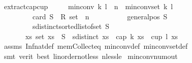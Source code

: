 \begin{isabellebody}
\isamarkupfalse%
%
\endisatagproof
{\isafoldproof}%
%
\isadelimproof
\isanewline
%
\endisadelimproof
\isanewline
{}\isamarkupfalse%
\ extract{\isacharunderscore}{\kern0pt}cap{\isacharunderscore}{\kern0pt}cup{\isacharcolon}{\kern0pt}\isanewline
\ \ \ \ \ {\isachardoublequoteopen}min{\isacharunderscore}{\kern0pt}conv\ k\ l\ {\isacharequal}{\kern0pt}\ n{\isachardoublequoteclose}\ \ {\isachardoublequoteopen}min{\isacharunderscore}{\kern0pt}conv{\isacharunderscore}{\kern0pt}set\ k\ l\ {\isasymnoteq}\ {\isacharbraceleft}{\kern0pt}{\isacharbraceright}{\kern0pt}{\isachardoublequoteclose}\isanewline
\ \ \ \ \ \ \ \ \ {\isachardoublequoteopen}card\ {\isacharparenleft}{\kern0pt}S\ {\isacharcolon}{\kern0pt}{\isacharcolon}{\kern0pt}\ R{}\ set{\isacharparenright}{\kern0pt}\ {\isacharequal}{\kern0pt}\ n{\isachardoublequoteclose}\ \isanewline
\ \ \ \ \ \ \ \ \ {\isachardoublequoteopen}general{\isacharunderscore}{\kern0pt}pos\ S{\isachardoublequoteclose}\isanewline
\ \ \ \ \ \ \ \ \ {\isachardoublequoteopen}sdistinct{\isacharparenleft}{\kern0pt}sorted{\isacharunderscore}{\kern0pt}list{\isacharunderscore}{\kern0pt}of{\isacharunderscore}{\kern0pt}set\ S{\isacharparenright}{\kern0pt}{\isachardoublequoteclose}\isanewline
\ \ \ \ \ \ \ {\isachardoublequoteopen}{\isasymexists}xs{\isachardot}{\kern0pt}\ set\ xs\ {\isasymsubseteq}\ S\ {\isasymand}\ sdistinct\ xs\ {\isasymand}\ {\isacharparenleft}{\kern0pt}cap\ k\ xs\ {\isasymor}\ cup\ l\ xs{\isacharparenright}{\kern0pt}{\isachardoublequoteclose}\isanewline
%
\isadelimproof
\ \ %
\endisadelimproof
%
\isatagproof
{}\isamarkupfalse%
\ assms\ Inf{\isacharunderscore}{\kern0pt}nat{\isacharunderscore}{\kern0pt}def{}\ mem{\isacharunderscore}{\kern0pt}Collect{\isacharunderscore}{\kern0pt}eq\ min{\isacharunderscore}{\kern0pt}conv{\isacharunderscore}{\kern0pt}def\ min{\isacharunderscore}{\kern0pt}conv{\isacharunderscore}{\kern0pt}set{\isacharunderscore}{\kern0pt}def\isanewline
\ \ \isamarkupfalse%
\ {\isacharparenleft}{\kern0pt}smt\ {\isacharparenleft}{\kern0pt}verit{\isacharcomma}{\kern0pt}\ best{\isacharparenright}{\kern0pt}\ linorder{\isacharunderscore}{\kern0pt}not{\isacharunderscore}{\kern0pt}less\ nless{\isacharunderscore}{\kern0pt}le{\isacharparenright}{\kern0pt}%
\endisatagproof
{\isafoldproof}%
%
\isadelimproof
\isanewline
%
\endisadelimproof
\isanewline
{}\isamarkupfalse%
\ min{\isacharunderscore}{\kern0pt}conv{\isacharunderscore}{\kern0pt}num{\isacharunderscore}{\kern0pt}out{\isacharcolon}{\kern0pt}\isanewline

\end{isabellebody}
